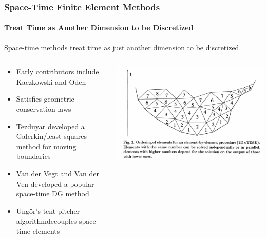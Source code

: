 \documentclass[18pt,xcolor=table]{beamer}
\begin{document}
\begin{frame}[t]
\frametitle{Space-Time Finite Element Methods}
\framesubtitle{Treat Time as Another Dimension to be Discretized}
Space-time methods treat time as just another dimension to be discretized.
\begin{columns}[c]
\begin{column}{.7\textwidth}
\begin{itemize}
  \item Early contributors include Kaczkowski and Oden 
  \item Satisfies geometric conservation laws\footnotemark
  \item Tezduyar \etal\footnotemark developed a Galerkin/least-squares method for moving boundaries
  \item Van der Vegt and Van der Ven developed a popular space-time DG method\footnotemark
  \item {\"U}ng{\"o}r's tent-pitcher algorithm\footnotemark decouples space-time elements
\end{itemize}
\end{column}
\begin{column}{.3\textwidth}
\includegraphics[width=1.0\textwidth]{Motivation/TentPitcher.png}
\end{column}
\end{columns}
\end{frame}
\end{document}
